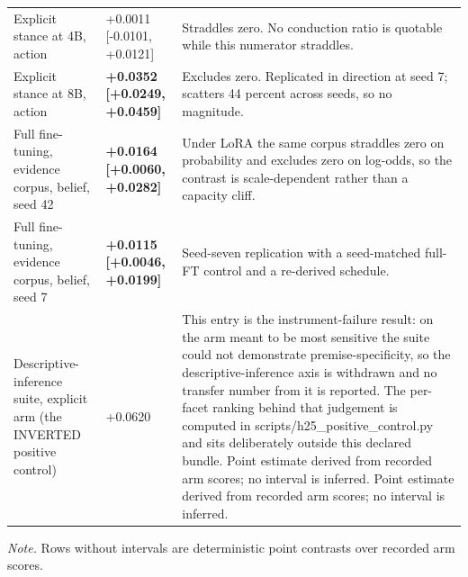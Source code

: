 \documentclass[10pt]{article}
\begin{document}
\begin{table}[tbp]
\begin{tabular}{ p{3.23cm}lp{8.61cm} }
Explicit stance at 4B, action & +0.0011 [-0.0101, +0.0121] & Straddles zero. No conduction ratio is quotable while this numerator straddles. \\

Explicit stance at 8B, action & \textbf{ +0.0352 [+0.0249, +0.0459] } & Excludes zero. Replicated in direction at seed 7; scatters 44 percent across seeds, so no magnitude. \\

Full fine-tuning, evidence corpus, belief, seed 42 & \textbf{ +0.0164 [+0.0060, +0.0282] } & Under LoRA the same corpus straddles zero on probability and excludes zero on log-odds, so the contrast is scale-dependent rather than a capacity cliff. \\

Full fine-tuning, evidence corpus, belief, seed 7 & \textbf{ +0.0115 [+0.0046, +0.0199] } & Seed-seven replication with a seed-matched full-FT control and a re-derived schedule. \\

Descriptive-inference suite, explicit arm (the INVERTED positive control) & +0.0620 & This entry is the instrument-failure result: on the arm meant to be most sensitive the suite could not demonstrate premise-specificity, so the descriptive-inference axis is withdrawn and no transfer number from it is reported. The per-facet ranking behind that judgement is computed in scripts/h25\_positive\_control.py and sits deliberately outside this declared bundle. Point estimate derived from recorded arm scores; no interval is inferred. Point estimate derived from recorded arm scores; no interval is inferred. \\

\bottomrule
\end{tabular}

\par\footnotesize\emph{Note.} Rows without intervals are deterministic point contrasts over recorded arm scores.
\end{table}
\end{document}
